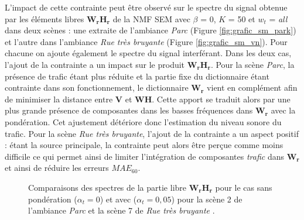 L'impact de cette contrainte peut être observé sur le spectre du signal obtenue par les éléments libres $\mathbf{W_rH_r} $ de la NMF SEM avec $\beta$ = 0, $K$ = 50 et $w_t$ = \textit{all} dans deux scènes : une extraite de l'ambiance \textit{Parc} (Figure \ref{fig:grafic_sm_park}) et l'autre dans l'ambiance \textit{Rue très bruyante} (Figure \ref{fig:grafic_sm_vn}). Pour chacune on ajoute également le spectre du signal interférant. Dans les deux cas, l'ajout de la contrainte a un impact sur le produit $\mathbf{W_rH_r}$. Pour la scène \textit{Parc}, la présence de trafic étant plus réduite et la partie fixe du dictionnaire étant contrainte dans son fonctionnement, le dictionnaire $\mathbf{W_r}$ vient en complément afin de minimiser la distance entre $\mathbf{V}$ et $\mathbf{WH}$. Cette apport se traduit alors par une plus grande présence de composantes dans les basses fréquences dans $\mathbf{W_r}$ avec la pondération. Cet ajustement détériore donc l'estimation du niveau sonore du trafic. Pour la scène \textit{Rue très bruyante}, l'ajout de la contrainte a un aspect positif : étant la source principale, la contrainte peut alors être perçue comme moins \og difficile \fg{} ce qui permet ainsi de limiter l'intégration de composantes \textit{trafic} dans $\mathbf{W_r}$ et ainsi de réduire les erreurs $MAE_{60}$.

\begin{figure}[h!]
\centering
{}%
\qquad
{}%
\caption{Comparaisons des spectres de la partie libre $\mathbf{W_rH_r}$ pour le cas sans pondération ($\alpha_{t}= 0$) et avec ($\alpha_t = 0,05$) pour la scène 2 de l'ambiance \textit{Parc}  et la scène 7 de \textit{Rue très bruyante} .}
\label{fig:grafic_sm}
\end{figure}

